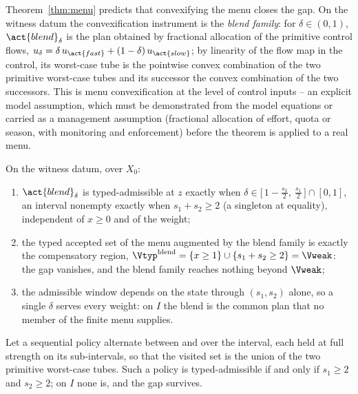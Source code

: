 Theorem~\ref{thm:menu} predicts that convexifying the menu closes the gap. On the witness datum the convexification instrument is the \emph{blend family}: for $\delta\in(0,1)$, $\act{blend}_\delta$ is the plan obtained by fractional allocation of the primitive control flows, $u_\delta=\delta\,u_{\act{fast}}+(1-\delta)\,u_{\act{slow}}$; by linearity of the flow map in the control, its worst-case tube is the pointwise convex combination of the two primitive worst-case tubes and its successor the convex combination of the two successors. This is menu convexification at the level of control inputs -- an explicit model assumption, which must be demonstrated from the model equations or carried as a management assumption (fractional allocation of effort, quota or season, with monitoring and enforcement) before the theorem is applied to a real menu.

\begin{theorem}\label{thm:blend}
On the witness datum, over $X_0$:
\begin{enumerate}[label=\textup{(\roman*)},leftmargin=2em]
\item $\act{blend}_\delta$ is typed-admissible at $z$ exactly when $\delta\in\big[\,1-\tfrac{s_2}2,\ \tfrac{s_1}2\,\big]\cap[0,1]$, an interval nonempty exactly when $s_1+s_2\ge2$ (a singleton at equality), independent of $x\ge0$ and of the weight;
\item the typed accepted set of the menu augmented by the blend family is exactly the compensatory region,
$\Vtyp^{\mathrm{blend}}=\{x\ge1\}\cup\{s_1+s_2\ge2\}=\Vweak$: the gap vanishes, and the blend family reaches nothing beyond $\Vweak$;
\item the admissible window depends on the state through $(s_1,s_2)$ alone, so a single $\delta$ serves every weight: on $I$ the blend is the common plan that no member of the finite menu supplies.
\end{enumerate}
\end{theorem}

\begin{proposition}\label{prop:timeshare}
Let a sequential policy alternate between  and  over the interval, each held at full strength on its sub-intervals, so that the visited set is the union of the two primitive worst-case tubes. Such a policy is typed-admissible if and only if $s_1\ge2$ and $s_2\ge2$; on $I$ none is, and the gap survives.
\end{proposition}


